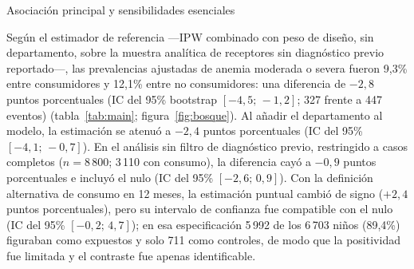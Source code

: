 \documentclass[man,11pt,donotrepeattitle,floatsintext]{apa7}
\makeatletter
\renewcommand{\subsection}{\@startsection{subsection}{2}{\z@}%
    {\b@level@two@skip}{\e@level@two@skip}%
    {\normalfont\normalsize\bfseries\raggedright}}
\makeatother
\begin{document}
\subsection{Asociación principal y sensibilidades esenciales}

Según el estimador de referencia ---IPW combinado con peso de diseño, sin departamento, sobre la muestra analítica de receptores sin diagnóstico previo reportado---, las prevalencias ajustadas de anemia moderada o severa fueron 9{,}3\% entre consumidores y 12{,}1\% entre no consumidores: una diferencia de $-2{,}8$ puntos porcentuales (IC del 95\% bootstrap $[-4{,}5;\,-1{,}2]$; 327 frente a 447 eventos) (tabla~\ref{tab:main}; figura~\ref{fig:bosque}). Al añadir el departamento al modelo, la estimación se atenuó a $-2{,}4$ puntos porcentuales (IC del 95\% $[-4{,}1;\,-0{,}7]$). En el análisis sin filtro de diagnóstico previo, restringido a casos completos ($n=8\,800$; 3\,110 con consumo), la diferencia cayó a $-0{,}9$ puntos porcentuales e incluyó el nulo (IC del 95\% $[-2{,}6;\,0{,}9]$). Con la definición alternativa de consumo en 12 meses, la estimación puntual cambió de signo ($+2{,}4$ puntos porcentuales), pero su intervalo de confianza fue compatible con el nulo (IC del 95\% $[-0{,}2;\,4{,}7]$); en esa especificación 5\,992 de los 6\,703 niños (89{,}4\%) figuraban como expuestos y solo 711 como controles, de modo que la positividad fue limitada y el contraste fue apenas identificable.
\end{document}
